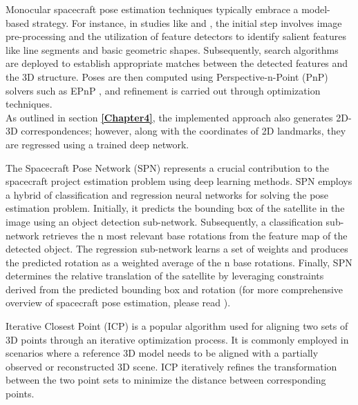 Monocular spacecraft pose estimation techniques typically embrace a model-based strategy. For instance, in studies like \cite{DAmico2014PoseEO} and \cite{Sharma2018RobustMM}, the initial step involves image pre-processing and the utilization of feature detectors to identify salient features like line segments and basic geometric shapes. Subsequently, search algorithms are deployed to establish appropriate matches between the detected features and the 3D structure. Poses are then computed using Perspective-n-Point (PnP) solvers such as EPnP \cite{Lepetit2009EPnPAA}, and refinement is carried out through optimization techniques.\\
As outlined in section \textbf{\ref{Chapter4}}, the implemented approach also generates 2D-3D correspondences; however, along with the coordinates of 2D landmarks, they are regressed using a trained deep network.

The Spacecraft Pose Network (SPN) \cite{SPN} represents a crucial contribution to the spacecraft project estimation problem using deep learning methods. SPN employs a hybrid of classification and regression neural networks for solving the pose estimation problem. Initially, it predicts the bounding box of the satellite in the image using an object detection sub-network. Subsequently, a classification sub-network retrieves the n most relevant base rotations from the feature map of the detected object. The regression sub-network learns a set of weights and produces the predicted rotation as a weighted average of the n base rotations. Finally, SPN determines the relative translation of the satellite by leveraging constraints derived from the predicted bounding box and rotation (for more comprehensive overview of spacecraft pose estimation, please read \cite{Cassinis2019DelftUO}).


Iterative Closest Point (ICP) \cite{ICP} is a popular algorithm used for aligning two sets of 3D points through an iterative optimization process. It is commonly employed in scenarios where a reference 3D model needs to be aligned with a partially observed or reconstructed 3D scene. ICP iteratively refines the transformation between the two point sets to minimize the distance between corresponding points.

